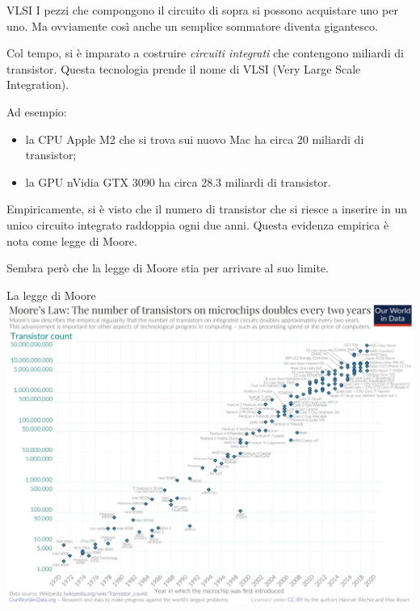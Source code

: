 \documentclass[aspectratio=169,10pt,dvipsnames,xcolor=table,handout]{beamer}
\begin{document}
\begin{frame}{VLSI}
    I pezzi che compongono il circuito di sopra si possono acquistare uno per uno. Ma ovviamente così anche un semplice sommatore diventa gigantesco.

    \medskip
    Col tempo, si è imparato a costruire \emph{circuiti integrati} che contengono miliardi di transistor. Questa tecnologia prende il nome di \alert{VLSI} (Very Large Scale Integration).

    \medskip
    Ad esempio:
    \begin{itemize}
        \item la CPU Apple M2 che si trova sui nuovo Mac ha circa 20 miliardi di transistor;
        \item la GPU nVidia GTX 3090 ha circa 28.3 miliardi di transistor.
    \end{itemize}

    \medskip
    Empiricamente, si è visto che il numero di transistor che si riesce a inserire in un unico circuito integrato raddoppia ogni due anni. Questa evidenza empirica è nota come \alert{legge di Moore}.

    \medskip
    Sembra però che la legge di Moore stia per arrivare al suo limite.
\end{frame}

\begin{frame}{La legge di Moore}
    \centering
    \includegraphics[height=0.85\textheight]{Moore's_Law_Transistor_Count_1970-2020.png}
\end{frame}
\end{document}
